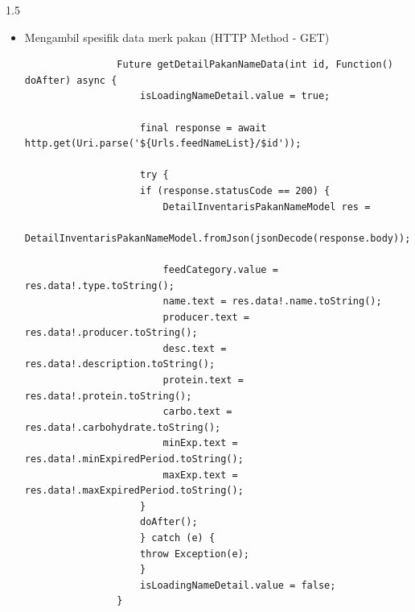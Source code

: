 \begin{spacing}{1.5}
\begin{enumerate}
\begin{itemize}
			\begin{lstlisting}
				Future getPakanNameData(String type, Function() doAfter) async {
					feedNameList.value.data!.clear();
					listPakanName.clear();
					isLoadingName.value = true;

					SharedPreferences prefs = await SharedPreferences.getInstance();
					String token = prefs.getString('token').toString();
					var headers = {'Authorization': 'Bearer $token'};

					final response = await http
						.get(Uri.parse('${Urls.feedNameList}?type=$type'), headers: headers);

					try {
					if (response.statusCode == 200) {
						InventarisPakanNameModel res =
							InventarisPakanNameModel.fromJson(jsonDecode(response.body));

						feedNameList.value = res;

						if (feedNameList.value.data!.isNotEmpty) {
						for (var i in feedNameList.value.data!) {
							listPakanName.add({
							'id': i.idInt,
							'feed_name_id': i.sId,
							'feed_name': i.name,
							});
						}

						selectedPakan.value = listPakanName[0];
						}
					}
					doAfter();
					} catch (e) {
					throw Exception(e);
					}
					isLoadingName.value = false;
				}
			\end{lstlisting}

			\item Mengambil spesifik data merk pakan (HTTP Method - GET)
			
			\begin{lstlisting}
				Future getDetailPakanNameData(int id, Function() doAfter) async {
					isLoadingNameDetail.value = true;

					final response = await http.get(Uri.parse('${Urls.feedNameList}/$id'));

					try {
					if (response.statusCode == 200) {
						DetailInventarisPakanNameModel res =
							DetailInventarisPakanNameModel.fromJson(jsonDecode(response.body));

						feedCategory.value = res.data!.type.toString();
						name.text = res.data!.name.toString();
						producer.text = res.data!.producer.toString();
						desc.text = res.data!.description.toString();
						protein.text = res.data!.protein.toString();
						carbo.text = res.data!.carbohydrate.toString();
						minExp.text = res.data!.minExpiredPeriod.toString();
						maxExp.text = res.data!.maxExpiredPeriod.toString();
					}
					doAfter();
					} catch (e) {
					throw Exception(e);
					}
					isLoadingNameDetail.value = false;
				}
			\end{lstlisting}


\end{itemize}
\end{enumerate}
\end{spacing}

